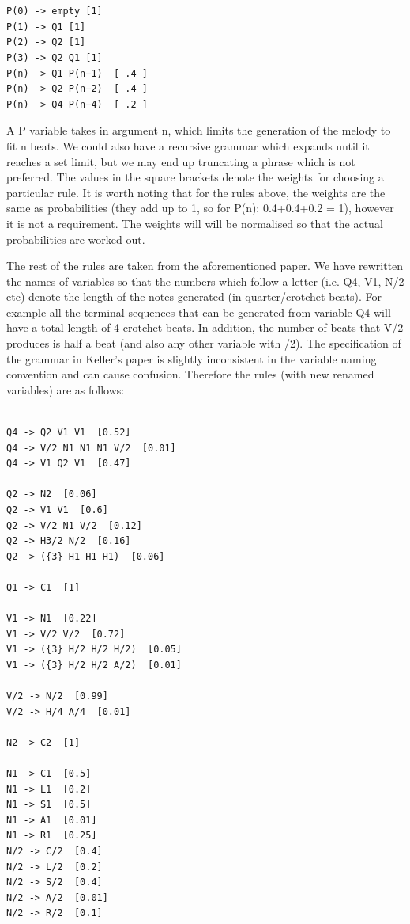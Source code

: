 \documentclass[pdftex,12pt,a4paper]{report}
\begin{document}
\begin{verbatim}


P(0) -> empty [1]
P(1) -> Q1 [1] 
P(2) -> Q2 [1] 
P(3) -> Q2 Q1 [1] 
P(n) -> Q1 P(n−1)  [ .4 ]
P(n) -> Q2 P(n−2)  [ .4 ] 
P(n) -> Q4 P(n−4)  [ .2 ]

\end{verbatim}

A P variable takes in argument n, which limits the generation of the melody to fit n beats. We could also have a recursive grammar which expands until it reaches a set limit, but we may end up truncating a phrase which is not preferred. The values in the square brackets denote the weights for choosing a particular rule. It is worth noting that for the rules above, the weights are the same as probabilities (they add up to 1, so for P(n):  0.4+0.4+0.2 = 1), however it is not a requirement. The weights will will be normalised so that the actual probabilities are worked out.

The rest of the rules are taken from the aforementioned paper. We have rewritten the names of variables so that the numbers which follow a letter (i.e. Q4, V1, N/2 etc) denote the length of the notes generated (in quarter/crotchet beats). For example all the terminal sequences that can be generated from variable Q4 will have a total length of 4 crotchet beats. In addition, the number of beats that V/2 produces is half a beat (and also any other variable with /2). The specification of the grammar in Keller's paper \cite{keller07} is slightly inconsistent in the variable naming convention and can cause confusion. Therefore the rules (with new renamed variables) are as follows:

\begin{verbatim}

Q4 -> Q2 V1 V1  [0.52]
Q4 -> V/2 N1 N1 N1 V/2  [0.01]
Q4 -> V1 Q2 V1  [0.47]

Q2 -> N2  [0.06]
Q2 -> V1 V1  [0.6]
Q2 -> V/2 N1 V/2  [0.12]
Q2 -> H3/2 N/2  [0.16]
Q2 -> ({3} H1 H1 H1)  [0.06]

Q1 -> C1  [1]

V1 -> N1  [0.22]
V1 -> V/2 V/2  [0.72]
V1 -> ({3} H/2 H/2 H/2)  [0.05]
V1 -> ({3} H/2 H/2 A/2)  [0.01]

V/2 -> N/2  [0.99]
V/2 -> H/4 A/4  [0.01]

N2 -> C2  [1]

N1 -> C1  [0.5]
N1 -> L1  [0.2]
N1 -> S1  [0.5]
N1 -> A1  [0.01]
N1 -> R1  [0.25]
N/2 -> C/2  [0.4]
N/2 -> L/2  [0.2]
N/2 -> S/2  [0.4]
N/2 -> A/2  [0.01]
N/2 -> R/2  [0.1]

\end{verbatim}
\end{document}
